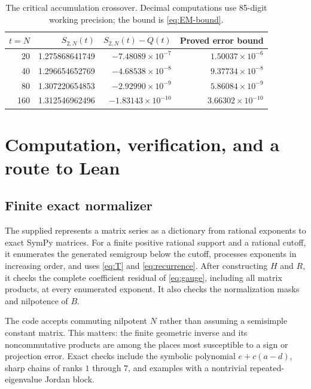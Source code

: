 \documentclass[11pt,a4paper]{article}
\numberwithin{equation}{section}
\theoremstyle{definition}
\theoremstyle{remark}
\begin{document}
\begin{table}[htbp]
\centering
\small
\begin{tabular}{rrrr}
\toprule
$t=N$ & $S_{2,N}(t)$ & $S_{2,N}(t)-Q(t)$ & Proved error bound\\
\midrule
20 & 1.275868641749 & $-7.48089\times10^{-7}$ & $1.50037\times10^{-6}$\\
40 & 1.296654652769 & $-4.68538\times10^{-8}$ & $9.37734\times10^{-8}$\\
80 & 1.307220654853 & $-2.92990\times10^{-9}$ & $5.86084\times10^{-9}$\\
160 & 1.312546962496 & $-1.83143\times10^{-10}$ & $3.66302\times10^{-10}$\\
\bottomrule
\end{tabular}
\caption{The critical accumulation crossover. Decimal computations use
85-digit working precision; the bound is \eqref{eq:EM-bound}.}
\label{tab:crossover}
\end{table}

\section{Computation, verification, and a route to Lean}
\label{sec:verification}

\subsection{Finite exact normalizer}
The supplied  represents a matrix series as a
dictionary from rational exponents to exact SymPy matrices. For a finite
positive rational support and a rational cutoff, it enumerates the generated
semigroup below the cutoff, processes exponents in increasing order, and
uses \eqref{eq:T} and \eqref{eq:recurrence}. After constructing $H$ and
$R$, it checks the complete coefficient residual of \eqref{eq:gauge},
including all matrix products, at every enumerated exponent. It also
checks the normalization masks and nilpotence of $B$.

The code accepts commuting nilpotent $N$ rather than assuming a semisimple
constant matrix. This matters: the finite geometric inverse and its
noncommutative products are among the places most susceptible to a sign
or projection error. Exact checks include the symbolic polynomial
$e+c(a-d)$, sharp chains of ranks $1$ through $7$, and examples with a
nontrivial repeated-eigenvalue Jordan block.
\end{document}
